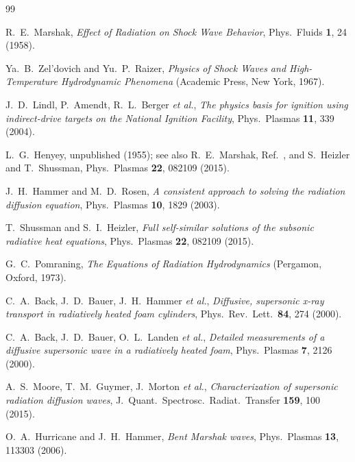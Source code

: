 \documentclass[prl, twocolumn, superscriptaddress, amsmath, amssymb, reprint]{revtex4-2}
\begin{document}
\begin{thebibliography}{99}

R.~E.~Marshak,
\textit{Effect of Radiation on Shock Wave Behavior},
Phys.\ Fluids \textbf{1}, 24 (1958).

Ya.~B.~Zel'dovich and Yu.~P.~Raizer,
\textit{Physics of Shock Waves and High-Temperature Hydrodynamic Phenomena}
(Academic Press, New York, 1967).

J.~D.~Lindl, P.~Amendt, R.~L.~Berger \textit{et al.},
\textit{The physics basis for ignition using indirect-drive targets on the National Ignition Facility},
Phys.\ Plasmas \textbf{11}, 339 (2004).

L.~G.~Henyey,
unpublished (1955);
see also R.~E.~Marshak, Ref.~\cite{Marshak1958}, and
S.~Heizler and T.~Shussman,
Phys.\ Plasmas \textbf{22}, 082109 (2015).

J.~H.~Hammer and M.~D.~Rosen,
\textit{A consistent approach to solving the radiation diffusion equation},
Phys.\ Plasmas \textbf{10}, 1829 (2003).

T.~Shussman and S.~I.~Heizler,
\textit{Full self-similar solutions of the subsonic radiative heat equations},
Phys.\ Plasmas \textbf{22}, 082109 (2015).

G.~C.~Pomraning,
\textit{The Equations of Radiation Hydrodynamics}
(Pergamon, Oxford, 1973).

C.~A.~Back, J.~D.~Bauer, J.~H.~Hammer \textit{et al.},
\textit{Diffusive, supersonic x-ray transport in radiatively heated foam cylinders},
Phys.\ Rev.\ Lett.\ \textbf{84}, 274 (2000).

C.~A.~Back, J.~D.~Bauer, O.~L.~Landen \textit{et al.},
\textit{Detailed measurements of a diffusive supersonic wave in a radiatively heated foam},
Phys.\ Plasmas \textbf{7}, 2126 (2000).

A.~S.~Moore, T.~M.~Guymer, J.~Morton \textit{et al.},
\textit{Characterization of supersonic radiation diffusion waves},
J.\ Quant.\ Spectrosc.\ Radiat.\ Transfer \textbf{159}, 100 (2015).

O.~A.~Hurricane and J.~H.~Hammer,
\textit{Bent Marshak waves},
Phys.\ Plasmas \textbf{13}, 113303 (2006).


\end{thebibliography}
\end{document}
